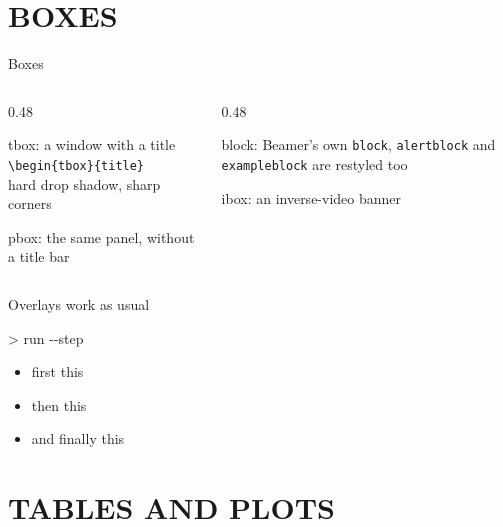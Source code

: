 \documentclass[aspectratio=169,10pt]{beamer}
\begin{document}
\section{BOXES}

\begin{frame}{Boxes}
\begin{columns}[T]
\begin{column}{0.48\textwidth}
\begin{tbox}{tbox: a window with a title}
\small
\texttt{\textbackslash begin\{tbox\}\{title\}}\\
hard drop shadow, sharp corners
\end{tbox}
\vskip10pt
\begin{pbox}
\small
pbox: the same panel, without a title bar
\end{pbox}
\end{column}
\begin{column}{0.48\textwidth}
\begin{block}{block: Beamer's own}
\small
\texttt{block}, \texttt{alertblock} and \texttt{exampleblock} are restyled too
\end{block}
\vskip10pt
\begin{ibox}
ibox: an inverse-video banner
\end{ibox}
\vskip10pt
\centering{}\quad{}
\end{column}
\end{columns}
\end{frame}

\begin{frame}{Overlays work as usual}
\begin{tbox}{> run -{}-step}
\small
\begin{itemize}
\item<1-> first this
\item<2-> then this
\item<3-> and finally this\,\terminalcursor
\end{itemize}
\end{tbox}
\end{frame}

\section{TABLES AND PLOTS}
\end{document}
